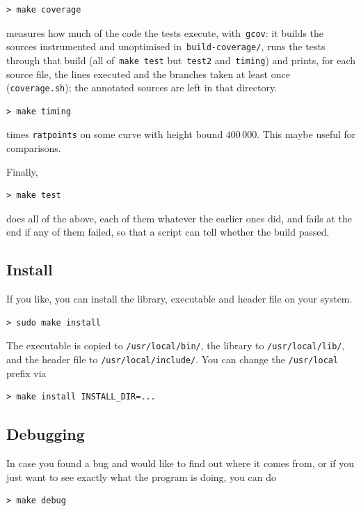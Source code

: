 \documentclass[12pt,a4paper,oneside]{amsart}
\begin{document}
\begin{verbatim}
> make coverage
\end{verbatim}
measures how much of the code the tests execute, with~\texttt{gcov}: it
builds the sources instrumented and unoptimised in~\texttt{build-coverage/},
runs the tests through that build (all of~\texttt{make test} but~\texttt{test2}
and~\texttt{timing}) and prints, for each source file, the lines executed
and the branches taken at least once (\texttt{coverage.sh});
the annotated sources are left in that directory.

\begin{verbatim}
> make timing
\end{verbatim}
times \texttt{ratpoints} on some curve with height bound $400\,000$.
This maybe useful for comparisons.

Finally,
\begin{verbatim}
> make test
\end{verbatim}
does all of the above, each of them whatever the earlier ones did, and
fails at the end if any of them failed, so that a script can tell whether
the build passed.

\subsection{Install}

If you like, you can install the library, executable and header file
on your system.

\begin{verbatim}
> sudo make install
\end{verbatim}

The executable is copied to \texttt{/usr/local/bin/}, the
library to \texttt{/usr/local/lib/}, and the header file to
\texttt{/usr/local/include/}. You can change the \texttt{/usr/local} prefix
via
\begin{verbatim}
> make install INSTALL_DIR=...
\end{verbatim}

\subsection{Debugging}

In case you found a bug and would like to find out where it comes from,
or if you just want to see exactly what the program is doing, you can
do

\begin{verbatim}
> make debug
\end{verbatim}
\end{document}
